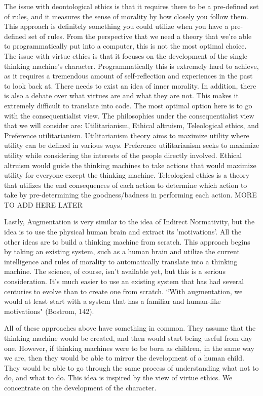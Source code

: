 \documentclass[11pt, oneside]{article}
\begin{document}
\par The issue with deontological ethics is that it requires there to be a pre-defined set of rules, and it measures the sense of morality by how closely you follow them. This approach is definitely something you could utilize when you have a pre-defined set of rules. From the perspective that we need a theory that we're able to programmatically put into a computer, this is not the most optimal choice. The issue with virtue ethics is that it focuses on the development of the single thinking machine's character. Programmatically this is extremely hard to achieve, as it requires a tremendous amount of self-reflection and experiences in the past to look back at. There needs to exist an idea of inner morality. In addition, there is also a debate over what virtues are and what they are not. This makes it extremely difficult to translate into code. The most optimal option here is to go with the consequentialist view. The philosophies under the consequentialist view that we will consider are: Utilitarianism, Ethical altruism, Teleological ethics, and Preference utilitarianism. Utilitarianism theory aims to maximize utility where utility can be defined in various ways. Preference utilitarianism seeks to maximize utility while considering the interests of the people directly involved. Ethical altruism would guide the thinking machines to take actions that would maximize utility for everyone except the thinking machine. Teleological ethics is a theory that utilizes the end consequences of each action to determine which action to take by pre-determining the goodness/badness in performing each action. {MORE TO ADD HERE LATER}
 
\par Lastly, Augmentation is very similar to the idea of Indirect Normativity, but the idea is to use the physical human brain and extract its 'motivations'. All the other ideas are to build a thinking machine from scratch. This approach begins by taking an existing system, such as a human brain and utilize the current intelligence and rules of morality to automatically translate into a thinking machine. The science, of course, isn't available yet, but this is a serious consideration. It's much easier to use an existing system that has had several centuries to evolve than to create one from scratch. ``With augmentation, we would at least start with a system that has a familiar and human-like motivations" (Bostrom, 142).
 
\par All of these approaches above have something in common. They assume that the thinking machine would be created, and then would start being useful from day one. However, if thinking machines were to be born as children, in the same way we are, then they would be able to mirror the development of a human child. They would be able to go through the same process of understanding what not to do, and what to do. This idea is inspired by the view of virtue ethics. We concentrate on the development of the character.
 
\end{document}
